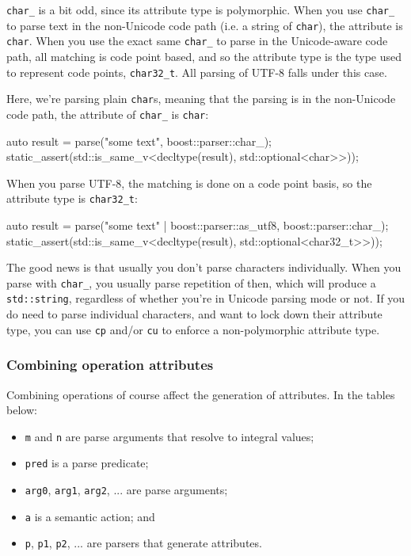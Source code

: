 \texttt{char\_} is a bit odd, since its attribute type is polymorphic. When you use \texttt{char\_} to parse text in the non-Unicode code path (i.e. a string of \texttt{char}), the attribute is \texttt{char}. When you use the exact same \texttt{char\_} to parse in the Unicode-aware code path, all matching is code point based, and so the attribute type is the type used to represent code points, \texttt{char32\_t}. All parsing of UTF-8 falls under this case.

Here, we're parsing plain \texttt{char}s, meaning that the parsing is in the non-Unicode code path, the attribute of \texttt{char\_} is \texttt{char}:

\begin{code}
auto result = parse("some text", boost::parser::char_);
static_assert(std::is_same_v<decltype(result), std::optional<char>>));
\end{code}

When you parse UTF-8, the matching is done on a code point basis, so the attribute type is \texttt{char32\_t}:

\begin{code}
auto result = parse("some text" | boost::parser::as_utf8, boost::parser::char_);
static_assert(std::is_same_v<decltype(result), std::optional<char32_t>>));
\end{code}

The good news is that usually you don't parse characters individually. When you parse with \texttt{char\_}, you usually parse repetition of then, which will produce a \texttt{std::string}, regardless of whether you're in Unicode parsing mode or not. If you do need to parse individual characters, and want to lock down their attribute type, you can use \texttt{cp} and/or \texttt{cu} to enforce a non-polymorphic attribute type.

\subsubsection{Combining operation attributes}

Combining operations of course affect the generation of attributes. In the tables below:

\begin{itemize}
\item
  \texttt{m} and \texttt{n} are parse arguments that resolve to integral values;
\item
  \texttt{pred} is a parse predicate;
\item
  \texttt{arg0}, \texttt{arg1}, \texttt{arg2}, ... are parse arguments;
\item
  \texttt{a} is a semantic action; and
\item
  \texttt{p}, \texttt{p1}, \texttt{p2}, ... are parsers that generate attributes.
\end{itemize}

